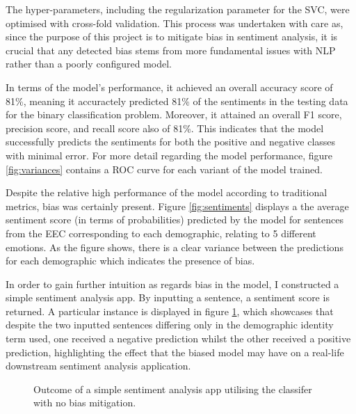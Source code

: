 \documentclass[a4paper]{IEEEtran}
\begin{document}
The hyper-parameters, including the regularization parameter for the SVC, were optimised with cross-fold validation. This process was undertaken with care as, since the purpose of this project is to mitigate bias in sentiment analysis, it is crucial that any detected bias stems from more fundamental issues with NLP rather than a poorly configured model.

In terms of the model's performance, it achieved an overall accuracy score of 81\%, meaning it accuractely predicted 81\% of the sentiments in the testing data for the binary classification problem. Moreover, it attained an overall F1 score, precision score, and recall score also of 81\%. This indicates that the model successfully predicts the sentiments for both the positive and negative classes with minimal error. For more detail regarding the model performance, figure \ref{fig:variances} contains a ROC curve for each variant of the model trained. 

Despite the relative high performance of the model according to traditional metrics, bias was certainly present. Figure \ref{fig:sentiments} displays a the average sentiment score (in terms of probabilities) predicted by the model for sentences from the EEC corresponding to each demographic, relating to 5 different emotions. As the figure shows, there is a clear variance between the predictions for each demographic which indicates the presence of bias.

In order to gain further intuition as regards bias in the model, I constructed a simple sentiment analysis app. By inputting a sentence, a sentiment score is returned. A particular instance is displayed in figure \ref{fig:app}, which showcases that despite the two inputted sentences differing only in the demographic identity term used, one received a negative prediction whilst the other received a positive prediction, highlighting the effect that the biased model may have on a real-life downstream sentiment analysis application.

\begin{figure}[htbp]
\caption{Outcome of a simple sentiment analysis app utilising the classifer with no bias mitigation.}
\label{fig:app}
\end{figure}
\end{document}
